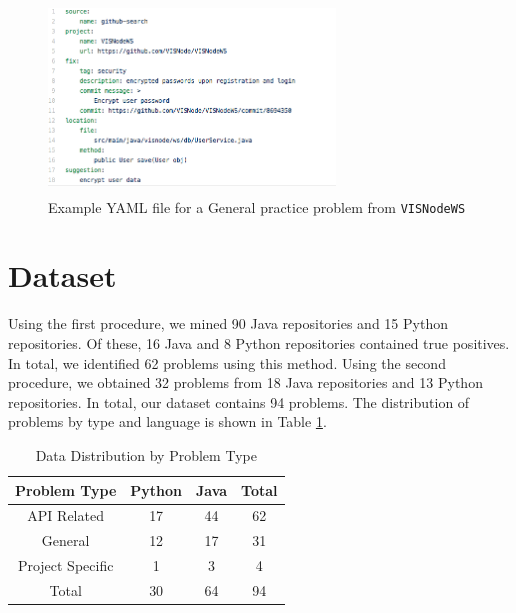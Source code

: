 \documentclass[sigconf]{acmart}
\begin{document}
\begin{figure}
  \includegraphics[height=2in, width=3in]{YAMLmetadata2}
  \caption{Example YAML file for a General practice problem from \texttt{VISNodeWS}}
  \label{fig:meta2}
\end{figure}

\section{Dataset}

Using the first procedure, we mined 90 Java repositories and 15 Python repositories. Of these, 16 Java and 8 Python repositories contained true positives. In total, we identified 62  problems using this method. Using the second procedure, we obtained 32 problems from 18 Java repositories and 13 Python repositories. In total, our dataset contains 94 problems. The distribution of problems by type and language is shown in Table \ref{tab:type}.

\begin{table}

  \caption{Data Distribution by Problem Type}
  \label{tab:type}
\begin{tabular}{ c c c c }
  \toprule
  Problem Type & Python & Java & Total \\
  \midrule
  API Related       &	17  &  44 &  62\\
  General    		&	12  &  17 &  31\\
  Project Specific  &	 1  &   3 &   4\\
  \midrule
  Total      		&	30  &  64 &  94\\
  \bottomrule
\end{tabular}
\end{table}
\end{document}
